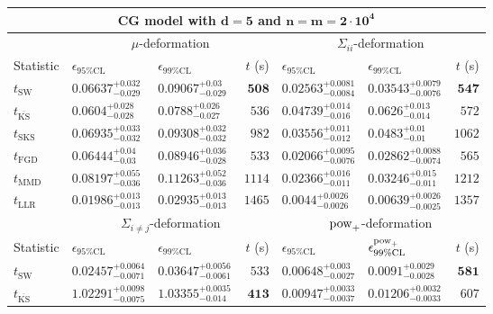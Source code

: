 \begin{tabular}{l|llr|llr}
	\toprule
	\multicolumn{7}{c}{{\bf CG model with $\mathbf{d=5}$ and $\mathbf{n=m=2\cdot 10^{4}}$}} \\
	\toprule
	\multicolumn{1}{c}{} & \multicolumn{3}{c}{$\mu$-deformation} & \multicolumn{3}{c}{$\Sigma_{ii}$-deformation} \\
	Statistic & $\epsilon_{95\%\mathrm{CL}}$ & $\epsilon_{99\%\mathrm    {CL}}$ & $t$ (s) & $\epsilon_{95\%\mathrm{CL}}$ & $\epsilon_{99\%\mathrm{CL}}$ & $t$ (s) \\
	\midrule
	$t_{\mathrm{SW}}$ & $0.06637_{-0.029}^{+0.032}$ & $0.09067_{-0.029}^{+0.03}$ & ${\mathbf{508}}$ & $0.02563_{-0.0084}^{+0.0081}$ & $0.03543_{-0.0076}^{+0.0079}$ & ${\mathbf{547}}$ \\
	$t_{\overline{\mathrm{KS}}}$ & ${\mathbf{0.0604_{-0.028}^{+0.028}}}$ & ${\mathbf{0.0788_{-0.027}^{+0.026}}}$ & $536$ & $0.04739_{-0.016}^{+0.014}$ & $0.0626_{-0.014}^{+0.013}$ & $572$ \\
	$t_{\mathrm{SKS}}$ & $0.06935_{-0.032}^{+0.033}$ & $0.09308_{-0.032}^{+0.032}$ & $982$ & $0.03556_{-0.012}^{+0.011}$ & $0.0483_{-0.01}^{+0.01}$ & $1062$ \\
	$t_{\mathrm{FGD}}$ & $0.06444_{-0.03}^{+0.04}$ & $0.08946_{-0.028}^{+0.036}$ & $533$ & ${\mathbf{0.02066_{-0.0076}^{+0.0095}}}$ & ${\mathbf{0.02862_{-0.0074}^{+0.0088}}}$ & $565$ \\
	$t_{\mathrm{MMD}}$ & $0.08197_{-0.036}^{+0.055}$ & $0.11263_{-0.036}^{+0.052}$ & $1114$ & $0.02366_{-0.011}^{+0.016}$ & $0.03246_{-0.011}^{+0.015}$ & $1212$ \\
	$t_{\mathrm{LLR}}$ & $0.01986_{-0.013}^{+0.013}$ & $0.02935_{-0.013}^{+0.013}$ & $1465$ & $0.0044_{-0.0026}^{+0.0026}$ & $0.00639_{-0.0025}^{+0.0026}$ & $1357$ \\
	\toprule
	\multicolumn{1}{c}{} & \multicolumn{3}{c}{$\Sigma_{i\neq j}$-deformation} & \multicolumn{3}{c}{$\rm{pow}_{+}$-deformation} \\
	Statistic & $\epsilon_{95\%\mathrm{CL}}$ & $\epsilon_{99\%\mathrm{CL}}$ & $t$ (s) & $\epsilon_{95\%\mathrm{CL}}$ & $\epsilon^{\rm   {pow}_{+}}_{99\%\mathrm{CL}}$ & $t$ (s) \\
	\midrule
	$t_{\mathrm{SW}}$ & $0.02457_{-0.0071}^{+0.0064}$ & $0.03647_{-0.0061}^{+0.0056}$ & $533$ & $0.00648_{-0.0027}^{+0.003}$ & $0.0091_{-0.0028}^{+0.0029}$ & ${\mathbf{581}}$ \\
	$t_{\overline{\mathrm{KS}}}$ & $1.02291_{-0.0075}^{+0.0098}$ & $1.03355_{-0.014}^{+0.0035}$ & ${\mathbf{413}}$ & $0.00947_{-0.0037}^{+0.0033}$ & $0.01206_{-0.0033}^{+0.0032}$ & $607$ \\

\end{tabular}
